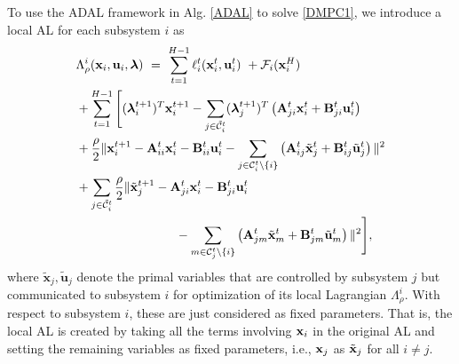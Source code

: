 \documentclass[doublecolumn]{IEEEtran}
\begin{document}
To use the ADAL framework in Alg. \ref{ADAL} to solve \eqref{DMPC1}, we introduce a local AL for each subsystem $i$ as
\begin{align}\label{local_AL}
	&\Lambda_{\rho}^i({ {\bf x} }_i,{\mathbf{u}}_i,{\boldsymbol{\lambda}}) ~=~   \sum_{t=1}^{H-1} \ell^t_i({ {\bf x} }_i^t,{\mathbf{u}}_i^t) ~+ { \mathcal{F} }_i({ {\bf x} }_i^{H})    \\
	& +\sum_{t=1}^{H-1} \Bigg[ ({\boldsymbol{\lambda}}_i^{t+1})^T{ {\bf x} }_i^{t+1} -  \sum_{j\in{\tilde{\mathcal{C}}}_i^t} ({\boldsymbol{\lambda}}_j^{t+1})^T \left({ {\bf A} }_{ji}^t { {\bf x} }_i^t + {\mathbf{B}}_{ji}^t {\mathbf{u}}_i^t\right)  \nonumber\\
	& + \frac{\rho}{2}\| { {\bf x} }_i^{t+1} - { {\bf A} }_{ii}^t { {\bf x} }_i^t - {\mathbf{B}}_{ii}^t {\mathbf{u}}_i^t -\sum_{j\in{\mathcal{C}}_i^t\backslash\{i\}} \left({ {\bf A} }_{ij}^t {\tilde{\mathbf{x}}}_j^t + {\mathbf{B}}_{ij}^t {\tilde{\mathbf{u}}}_j^t \right) \|^2  \nonumber\\
	& + \sum_{j\in{\tilde{\mathcal{C}}}_i^t}\frac{\rho}{2}\| {\tilde{\mathbf{x}}}_j^{t+1} - { {\bf A} }_{ji}^t { {\bf x} }_i^t - {\mathbf{B}}_{ji}^t {\mathbf{u}}_i^t \nonumber\\
	& \qquad \qquad \qquad\qquad- \sum_{m\in{\mathcal{C}}_j^t\backslash\{i\}}\left({ {\bf A} }_{jm}^t {\tilde{\mathbf{x}}}_m^t + {\mathbf{B}}_{jm}^t {\tilde{\mathbf{u}}}_m^t\right) \|^2 \Bigg],  \nonumber
\end{align}
where  ${\tilde{\mathbf{x}}}_j,{\tilde{\mathbf{u}}}_j$ denote the primal variables that are controlled by subsystem $j$  but communicated to subsystem $i$ for optimization of its local Lagrangian $\Lambda_{\rho}^i$. With respect to subsystem $i$, these are just considered as fixed parameters.
That is, the local AL is created by taking all the terms involving ${ {\bf x} }_i$ in the original AL and setting the remaining variables as fixed parameters, i.e., ${ {\bf x} }_j$ as $\tilde{ {\bf x} }_j$ for all $i \neq j$.
\end{document}

